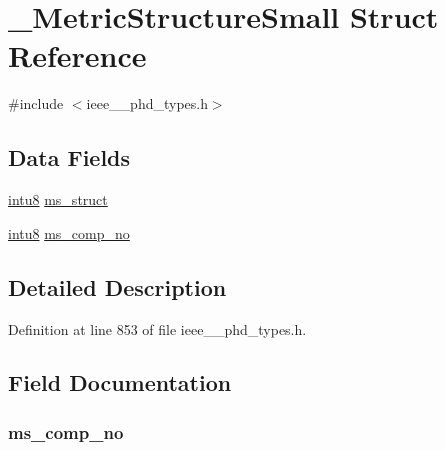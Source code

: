 \hypertarget{struct___metric_structure_small}{}\section{\+\_\+\+Metric\+Structure\+Small Struct Reference}
\label{struct___metric_structure_small}


{\ttfamily \#include $<$ieee\+\_\+\_\+phd\+\_\+types.\+h$>$}

\subsection*{Data Fields}
\begin{DoxyCompactItemize}
\item 
\hyperlink{ieee__11073__phd__types_8h_ae21d5428a584a153613cbe335630d3f4}{intu8} \hyperlink{struct___metric_structure_small_a7f9c3ebc59ea7f2a644219509d51c1f1}{ms\+\_\+struct}
\item 
\hyperlink{ieee__11073__phd__types_8h_ae21d5428a584a153613cbe335630d3f4}{intu8} \hyperlink{struct___metric_structure_small_a1909958eda1625e7c364f54e3456f64d}{ms\+\_\+comp\+\_\+no}
\end{DoxyCompactItemize}


\subsection{Detailed Description}


Definition at line 853 of file ieee\+\_\+\_\+phd\+\_\+types.\+h.



\subsection{Field Documentation}
\hypertarget{struct___metric_structure_small_a1909958eda1625e7c364f54e3456f64d}{}
\subsubsection[{ms\+\_\+comp\+\_\+no}]{ ms\+\_\+comp\+\_\+no}\label{struct___metric_structure_small_a1909958eda1625e7c364f54e3456f64d}


